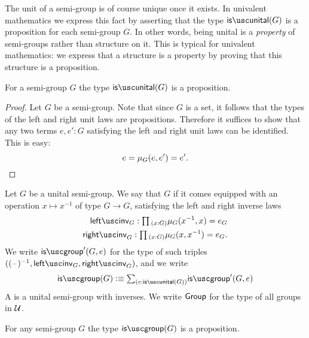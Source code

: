 The unit of a semi-group is of course unique once it exists. In univalent mathematics we express this fact by asserting that the type $\isunital(G)$ is a proposition for each semi-group $G$. In other words, being unital is a \emph{property} of semi-groups rather than structure on it. This is typical for univalent mathematics: we express that a structure is a property by proving that this structure is a proposition.

\begin{lem}
  For a semi-group $G$ the type $\isunital(G)$ is a proposition.
\end{lem}

\begin{proof}
  Let $G$ be a semi-group. Note that since $G$ is a set, it follows that the types of the left and right unit laws are propositions. Therefore it suffices to show that any two terms $e,e':G$ satisfying the left and right unit laws can be identified. This is easy:
  \begin{equation*}
    e = \mu_G(e,e') = e'.\qedhere
  \end{equation*}
\end{proof}

\begin{defn}
  Let $G$ be a unital semi-group. We say that $G$  if it comes equipped with an operation $x\mapsto x^{-1}$ of type $G\to G$, satisfying the left and right inverse laws
  \begin{align*}
    \leftinv_G : \prd{x:G}\mu_G(x^{-1},x)=e_G \\
    \rightinv_G : \prd{x:G}\mu_G(x,x^{-1}) = e_G.
  \end{align*}
  We write $\isgroup'(G,e)$ for the type of such triples $((\blank)^{-1},\leftinv_G,\rightinv_G)$, and we write
  \begin{equation*}
    \isgroup(G)\defeq\sm{e:\isunital(G)}\isgroup'(G,e)
  \end{equation*}
  A  is a unital semi-group with inverses. We write $\mathsf{Group}$ for the type of all groups in $\mathcal{U}$.
\end{defn}

\begin{lem}
  For any semi-group $G$ the type $\isgroup(G)$ is a proposition.
\end{lem}

